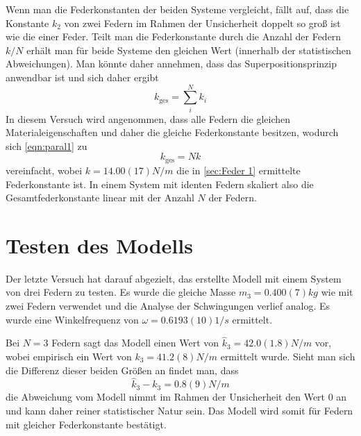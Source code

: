 Wenn man die Federkonstanten der beiden Systeme vergleicht, fällt auf, dass die Konstante \( k_2 \) von zwei Federn im Rahmen der Unsicherheit doppelt so groß ist wie die einer Feder. Teilt man die Federkonstante durch die Anzahl der Federn \( k/N \) erhält man für beide Systeme den gleichen Wert (innerhalb der statistischen Abweichungen). Man könnte daher annehmen, dass das Superpositionsprinzip anwendbar ist und sich daher ergibt
\begin{equation}\label{eqn:paral1}
	k_{\text{ges}} = \sum_{i}^{N} k_i
\end{equation}
In diesem Versuch wird angenommen, dass alle Federn die gleichen Materialeigenschaften und daher die gleiche Federkonstante besitzen, wodurch sich \autoref{eqn:paral1} zu
\begin{equation}\label{eqn:paral2}
	k_{\text{ges}} = Nk
\end{equation}
vereinfacht, wobei \( k = 14.00(17) \unit{N/m} \) die in \autoref{sec:Feder 1} ermittelte Federkonstante ist. In einem System mit identen Federn skaliert also die Gesamtfederkonstante linear mit der Anzahl \( N \) der Federn.

\section{Testen des Modells}
Der letzte Versuch hat darauf abgezielt, das erstellte Modell mit einem System von drei Federn zu testen. Es wurde die gleiche Masse \( m_3 = 0.400(7) \unit{kg} \) wie mit zwei Federn verwendet und die Analyse der Schwingungen verlief analog. Es wurde eine Winkelfrequenz von \( \omega = 0.6193(10) \unit{1/s} \) ermittelt.

Bei \( N = 3 \) Federn sagt das Modell einen Wert von \( \hat{k}_3 = 42.0(1.8) \unit{N/m} \) vor, wobei empirisch ein Wert von \( k_3 = 41.2(8) \unit{N/m} \) ermittelt wurde. Sieht man sich die Differenz dieser beiden Größen an findet man, dass
\begin{equation}\label{eqn:diff}
	\hat{k}_3 - k_3 = 0.8(9) \unit{N/m}
\end{equation}
die Abweichung vom Modell nimmt im Rahmen der Unsicherheit den Wert 0 an und kann daher reiner statistischer Natur sein. Das Modell wird somit für Federn mit gleicher Federkonstante bestätigt.






